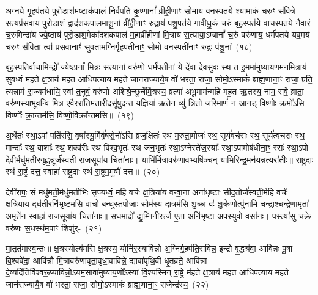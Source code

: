 अ॒ग्नये॑ गृ॒हप॑तये पुरो॒डाश॑\-म॒ष्टा\-क॑पालं॒ निर्व॑पति कृ॒ष्णानां᳚ व्रीही॒णाꣳ सोमा॑य॒ वन॒स्पत॑ये श्यामा॒कं च॒रुꣳ स॑वि॒त्रे स॒त्यप्र॑सवाय पुरो॒डाशं॒ द्वाद॑श\-कपालमाशू॒नां व्री॑ही॒णाꣳ रु॒द्राय॑ पशु॒पत॑ये गावीधु॒कं च॒रुं बृह॒स्पत॑ये वा॒चस्पत॑ये नैवा॒रं च॒रुमिन्द्रा॑य ज्ये॒ष्ठाय॑ पुरो॒डाश॒मेका॑\-दश\-कपालं म॒हाव्री॑हीणां मि॒त्राय॑ स॒त्याया॒\-ऽम्बानां᳚ च॒रुं वरु॑णाय॒ धर्म॑पतये यव॒मयं॑ च॒रुꣳ स॑वि॒ता त्वा᳚ प्रस॒वानाꣳ॑ सुवताम॒ग्निर्गृ॒हप॑तीना॒ꣳ॒ सोमो॒ वन॒स्पती॑नाꣳ रु॒द्रः प॑शू॒नां~(१८)

बृह॒स्पति॑र्वा॒चामिन्द्रो᳚ ज्ये॒ष्ठानां᳚ मि॒त्रः स॒त्यानां॒ वरु॑णो॒ धर्म॑पतीनां॒ ये दे॑वा देव॒सुवः॒ स्थ त इ॒ममा॑मुष्याय॒णम॑\-नमि॒त्राय॑ सुवध्वं मह॒ते क्ष॒त्राय॑ मह॒त आधि॑पत्याय मह॒ते जान॑राज्यायै॒ष वो॑ भरता॒ राजा॒ सोमो॒\-ऽस्माकं॑ ब्राह्म॒णाना॒ꣳ॒ राजा॒ प्रति॒ त्यन्नाम॑ रा॒ज्यम॑धायि॒ स्वां त॒नुवं॒ वरु॑णो अशिश्रे॒च्छुचे᳚र्मि॒त्रस्य॒ व्रत्या॑ अभू॒माम॑न्महि मह॒त ऋ॒तस्य॒ नाम॒ सर्वे॒ व्राता॒ वरु॑णस्याभूव॒न्वि मि॒त्र एवै॒ररा॑तिमतारी॒दसू॑षुदन्त य॒ज्ञिया॑ ऋ॒तेन॒ व्यु॑ त्रि॒तो ज॑रि॒माणं॑ न आन॒ड् विष्णोः॒ क्रमो॑\-ऽसि॒ विष्णोः᳚ क्रा॒न्तम॑सि॒ विष्णो॒र्विक्रा᳚न्तमसि॥~(१९)

{\anuvakamend[{प॒शू॒नां व्राताः॒ पञ्च॑विꣳशतिश्च}]}%

अ॒र्थेतः॑ स्था॒\-ऽपां पति॑रसि॒ वृषा᳚स्यू॒र्मिर्वृ॑षसे॒नो॑\-ऽसि व्रज॒क्षितः॑ स्थ म॒रुता॒मोजः॑ स्थ॒ सूर्य॑वर्चसः स्थ॒ सूर्य॑त्वचसः स्थ॒ मान्दाः᳚ स्थ॒ वाशाः᳚ स्थ॒ शक्व॑रीः स्थ विश्व॒भृतः॑ स्थ जन॒भृतः॑ स्था॒\-ऽग्नेस्ते॑ज॒स्याः᳚ स्था॒\-ऽपामोष॑धीना॒ꣳ॒ रसः॑ स्था॒\-ऽपो दे॒वीर्मधु॑मतीरगृह्ण॒न्नूर्ज॑स्वती राज॒सूया॑य॒ चिता॑नाः। याभि॑र्मि॒त्रावरु॑णाव॒भ्यषि॑ञ्च॒न्॒ याभि॒रिन्द्र॒मन॑य॒न्नत्यरा॑तीः॥ रा॒ष्ट्र॒दाः स्थ॑ रा॒ष्ट्रं द॑त्त॒ स्वाहा॑ राष्ट्र॒दाः स्थ॑ रा॒ष्ट्रम॒मुष्मै॑ दत्त॥~(२०)

{\anuvakamend[{अत्येका॑\-दश च}]}%

देवी॑रापः॒ सं मधु॑मती॒र्मधु॑मतीभिः सृज्यध्वं॒ महि॒ वर्चः॑ क्ष॒त्रिया॑य वन्वा॒ना अना॑धृष्टाः सीद॒तोर्ज॑स्वती॒र्महि॒ वर्चः॑ क्ष॒त्रिया॑य॒ दध॑ती॒रनि॑भृष्टमसि वा॒चो बन्धु॑स्तपो॒जाः सोम॑स्य दा॒त्रम॑सि शु॒क्रा वः॑ शु॒क्रेणोत्पु॑नामि च॒न्द्राश्च॒न्द्रेणा॒मृता॑ अ॒मृते॑न॒ स्वाहा॑ राज॒सूया॑य॒ चिता॑नाः॥ स॒ध॒मादो᳚ द्यु॒म्निनी॒रूर्ज॑ ए॒ता अनि॑भृष्टा अप॒स्युवो॒ वसा॑नः। प॒स्त्या॑सु चक्रे॒ वरु॑णः स॒धस्थ॑म॒पाꣳ शिशु॑र्-~(२१)

मा॒तृत॑मास्व॒न्तः॥ क्ष॒त्रस्योल्ब॑मसि क्ष॒त्रस्य॒ योनि॑र॒स्यावि॑न्नो अ॒ग्निर्गृ॒हप॑ति॒रावि॑न्न॒ इन्द्रो॑ वृ॒द्धश्र॑वा॒ आवि॑न्नः पू॒षा वि॒श्ववे॑दा॒ आवि॑न्नौ मि॒त्रावरु॑णावृता॒वृधा॒वावि॑न्ने॒ द्यावा॑पृथि॒वी धृ॒तव्र॑ते॒ आवि॑न्ना दे॒व्यदि॑तिर्विश्वरू॒प्यावि॑न्नो॒\-ऽयम॒सावा॑मुष्याय॒णो᳚\-ऽस्यां वि॒श्य॑स्मिन् रा॒ष्ट्रे म॑ह॒ते क्ष॒त्राय॑ मह॒त आधि॑पत्याय मह॒ते जान॑राज्यायै॒ष वो॑ भरता॒ राजा॒ सोमो॒\-ऽस्माकं॑ ब्राह्म॒णाना॒ꣳ॒ राजेन्द्र॑स्य॒~(२२)

